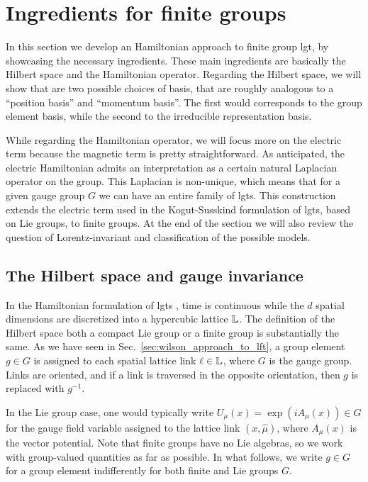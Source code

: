 \section{Ingredients for finite groups}
\label{sec:finite_group_gauge_theory}

In this section we develop an Hamiltonian approach to finite group \ac{lgt}, by showcasing the necessary ingredients.
These main ingredients are basically the Hilbert space and the Hamiltonian operator.
Regarding the Hilbert space, we will show that are two possible choices of basis, that are roughly analogous to a ``position basis'' and ``momentum basis''.
The first would corresponds to the group element basis, while the second to the irreducible representation basis.

While regarding the Hamiltonian operator, we will focus more on the electric term because the magnetic term is pretty straightforward.
As anticipated, the electric Hamiltonian admits an interpretation as a certain natural Laplacian operator on the group.
This Laplacian is non-unique, which means that for a given gauge group $G$ we can have an entire family of \acp{lgt}.
This construction extends the electric term used in the Kogut-Susskind formulation \cite{kogut1975hamiltonian} of \acp{lgt}, based on Lie groups, to finite groups.
At the end of the section we will also review the question of Lorentz-invariant and classification of the possible models.


\subsection{The Hilbert space and gauge invariance}%
\label{sub:the_hilbert_space}

In the Hamiltonian formulation of \acp{lgt} \cite{kogut1975hamiltonian, milstead2018qyangmills, zohar2015latticegauge}, time is continuous while the $d$ spatial dimensions are discretized into a hypercubic lattice $\mathbb{L}$.
The definition of the Hilbert space both a compact Lie group or a finite group is substantially the same.
As we have seen in Sec.~\ref{sec:wilson_approach_to_lft}, a group element $g \in G$ is assigned to each spatial lattice link $\ell \in \mathbb{L}$, where $G$ is the gauge group.
Links are oriented, and if a link is traversed in the opposite orientation, then $g$ is replaced with $g^{-1}$.

In the Lie group case, one would typically write $U_\mu(x) = \exp{(iA_\mu(x))} \in G$ for the gauge field variable assigned to the lattice link $(x, \hat{\mu})$, where $A_\mu(x)$ is the vector potential.
Note that finite groups have no Lie algebras, so we work with group-valued quantities as far as possible.
In what follows, we write $g \in G$ for a group element indifferently for both finite and Lie groups $G$.

